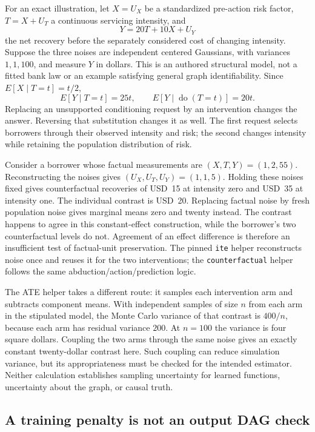For an exact illustration, let \(X=U_X\) be a standardized pre-action risk
factor, \(T=X+U_T\) a continuous servicing intensity, and
\[
       Y=20T+10X+U_Y
\]
the net recovery before the separately considered cost of changing intensity.
Suppose the three noises are independent centered Gaussians, with variances
\(1,1,100\), and measure \(Y\) in dollars. This is an authored structural
model, not a fitted bank law or an example satisfying general graph
identifiability. Since \(E[X\mid T=t]=t/2\),
\[
 E[Y\mid T=t]=25t,\qquad E[Y\mid\operatorname{do}(T=t)]=20t.
\]
Replacing an unsupported conditioning request by an intervention changes the
answer. Reversing that substitution changes it as well. The first request
selects borrowers through their observed intensity and risk; the second
changes intensity while retaining the population distribution of risk.
\citep{exec14_causica_exact}

Consider a borrower whose factual measurements are \((X,T,Y)=(1,2,55)\).
Reconstructing the noises gives \((U_X,U_T,U_Y)=(1,1,5)\). Holding these
noises fixed gives counterfactual
recoveries of USD~15 at intensity zero and USD~35 at intensity one. The
individual contrast is USD~20. Replacing factual noise by fresh population
noise gives marginal means zero and twenty instead. The contrast happens
to agree in this constant-effect construction, while the borrower's two
counterfactual levels do not. Agreement of an effect difference is therefore
an insufficient test of factual-unit preservation. The pinned \texttt{ite}
helper reconstructs noise once and reuses it for the two interventions;
the \texttt{counterfactual} helper follows the same abduction/action/prediction
logic. \citep{exec14_causica_primary,exec14_causica_exact}

The ATE helper takes a different route: it samples each intervention arm and
subtracts component means. With independent samples of size \(n\) from each
arm in the stipulated model, the Monte Carlo variance of that contrast is
\(400/n\), because each arm has residual variance \(200\). At \(n=100\)
the variance is four square dollars. Coupling the two arms through the same
noise gives an exactly constant twenty-dollar contrast here. Such coupling
can reduce simulation variance, but its appropriateness must be checked for
the intended estimator. Neither calculation establishes sampling uncertainty
for learned functions, uncertainty about the graph, or causal truth.
\citep{exec14_causica_exact}

\subsection{A training penalty is not an output DAG check}

